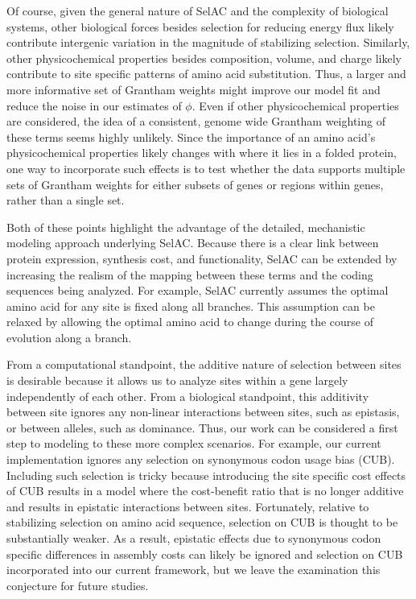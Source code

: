 \documentclass[12pt,letterpaper]{article}
\newcommand{\selac}{SelAC\xspace}
\begin{document}
Of course, given the general nature of \selac and the complexity of biological systems, other biological forces besides selection for reducing energy flux likely contribute intergenic variation in the magnitude of stabilizing selection.
Similarly, other physicochemical properties besides composition, volume, and charge likely contribute to site specific patterns of amino acid substitution. %
Thus, a larger and more informative set of Grantham weights might improve our model fit and reduce the noise in our estimates of $\phi$.
Even if other physicochemical properties are considered, the idea of a consistent, genome wide Grantham weighting of these terms seems highly unlikely.
Since the importance of an amino acid's physicochemical properties likely changes with where it lies in a folded protein, one way to incorporate such effects is to test whether the data supports multiple sets of Grantham weights for either subsets of genes or regions within genes, rather than a single set.


Both of these points highlight the advantage of the detailed, mechanistic modeling approach underlying \selac.
Because there is a clear link between protein expression, synthesis cost, and functionality, \selac can be extended by increasing the realism of the mapping between these terms and the coding sequences being analyzed.
For example, \selac currently assumes the optimal amino acid for any site is fixed along all branches.
This assumption can be relaxed by allowing the optimal amino acid to change during the course of evolution along a branch.

From a computational standpoint, the additive nature of selection between sites is desirable because it allows us to analyze sites within a gene largely independently of each other.
From a biological standpoint, this additivity between site ignores any non-linear interactions between sites, such as epistasis, or between alleles, such as dominance.
Thus, our work can be considered a first step to modeling to these more complex scenarios.
For example, our current implementation ignores any selection on synonymous codon usage bias (CUB).
Including such selection is tricky because introducing the site specific cost effects of CUB results in a model where the cost-benefit ratio that is no longer additive and results in epistatic interactions between sites.
Fortunately, relative to stabilizing selection on amino acid sequence, selection on CUB is thought to be substantially weaker.
As a result, epistatic effects due to synonymous codon specific differences in assembly costs can likely be ignored and selection on CUB incorporated into our current framework, but we leave the examination this conjecture for future studies. 
\end{document}
